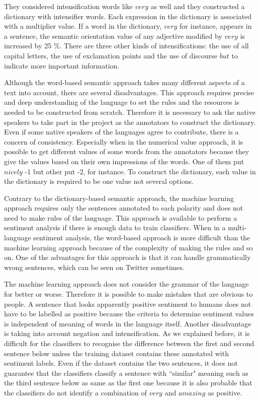 They considered intensification words like $very$ as well and they constructed a dictionary with intensifier words.
Each expression in the dictionary is associated with a multiplier value.
If a word in the dictionary, $very$ for instance, appears in a sentence, the semantic orientation value of any adjective modified by $very$ is increased by 25 \%. 
There are three other kinds of intensifications: the use of all capital letters, the use of exclamation points and the use of discourse $but$ to indicate more important information.

Although the word-based semantic approach takes many different aspects of a text into account, there are several disadvantages.
This approach requires precise and deep understanding of the language to set the rules and the resources is needed to be constructed from scratch.
Therefore it is necessary to ask the native speakers to take part in the project as the annotators to construct the dictionary.
Even if some native speakers of the languages agree to contribute, there is a concern of consistency.
Especially when in the numerical value approach, it is possible to get different values of some words from the annotators because they give the values based on their own impressions of the words.
One of them put $nicely$ -1 but other put -2, for instance.
To construct the dictionary, each value in the dictionary is required to be one value not several options.


Contrary to the dictionary-based semantic approach, the machine learning approach requires only the sentences annotated to each polarity and does not need to make rules of the language.
This approach is available to perform a sentiment analysis if there is enough data to train classifiers.
When in a multi-language sentiment analysis, the word-based approach is more difficult than the machine learning approach because of the complexity of making the rules and so on.
One of the advantages for this approach is that it can handle grammatically wrong sentences, which can be seen on Twitter sometimes.

The machine learning approach does not consider the grammar of the language for better or worse.
Therefore it is possible to make mistakes that are obvious to people.
A sentence that looks apparently positive sentiment to humans does not have to be labelled as positive because the criteria to determine sentiment values is independent of meaning of words in the language itself.
Another disadvantage is taking into account negation and intensification.
As we explained before, it is difficult for the classifiers to recognise the difference between the first and second sentence below unless the training dataset contains these annotated with sentiment labels.
Even if the dataset contains the two sentences, it does not guarantee that the classifiers classify a sentence with ``similar" meaning such as the third sentence below as same as the first one because it is also probable that the classifiers do not identify a combination of $very$ and $amazing$ as positive. 

